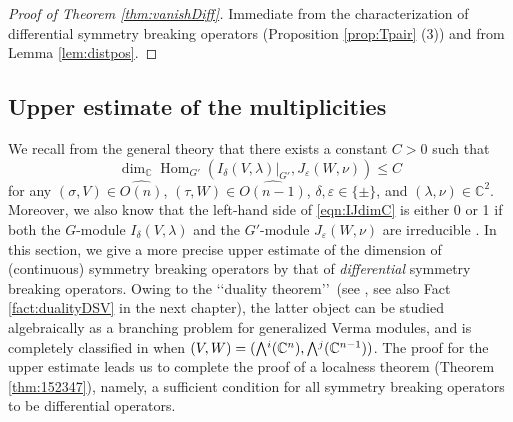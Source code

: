 \begin{proof}
[Proof of Theorem \ref{thm:vanishDiff}]
Immediate from the characterization 
 of differential symmetry breaking operators
 (Proposition \ref{prop:Tpair} (3)) and from Lemma \ref{lem:distpos}.  
\end{proof}

\subsection{Upper estimate of the multiplicities}
\label{subsec:SDone}
We recall from the general theory 
 \cite{xKOfm}
 that there exists a constant $C >0$
 such that
\begin{equation}
\label{eqn:IJdimC}
  \dim_{\mathbb{C}}{\operatorname{Hom}}_{G'}
  (I_{\delta}(V,\lambda)|_{G'}, J_{\varepsilon}(W,\nu))\le C
\end{equation}
for any $(\sigma,V) \in \widehat {O(n)}$, 
 $(\tau,W) \in \widehat {O(n-1)}$, 
 $\delta, \varepsilon \in \{\pm\}$, 
 and $(\lambda,\nu) \in {\mathbb{C}}^2$. 
Moreover,
 we also know
 that the left-hand side of \eqref{eqn:IJdimC} is either 0 or 1
 if both the $G$-module $I_{\delta}(V,\lambda)$
 and the $G'$-module $J_{\varepsilon}(W,\nu)$ are irreducible
 \cite{SunZhu}.  
In this section,
 we give a more precise upper estimate
 of the dimension of (continuous) symmetry breaking operators
 by that of {\it{differential}} symmetry breaking operators.  
Owing to the 
\lq\lq{duality theorem}\rq\rq\
 (see \cite[Thm.~2.9]{KP1}, 
 see also Fact \ref{fact:dualityDSV} in the next chapter), 
 the latter object can be studied algebraically
 as a branching problem for generalized Verma modules, 
 and is completely classified in \cite{KKP}
 when $(V,W)=(\Exterior^i({\mathbb{C}}^n), \Exterior^j({\mathbb{C}}^{n-1}))$.  
The proof for the upper estimate leads us 
 to complete the proof of a 
 localness theorem
 (Theorem \ref{thm:152347}), 
 namely,
 a sufficient condition
 for all symmetry breaking operators
 to be differential operators. 

